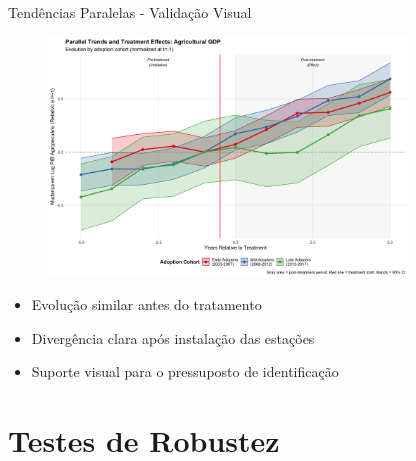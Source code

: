 \documentclass[10pt,aspectratio=169]{beamer}
\begin{document}
\begin{frame}{Tendências Paralelas - Validação Visual}
\begin{figure}
\centering
\includegraphics[width=0.85\textwidth]{../../../data/outputs/parallel_trends_complete_pib_agro_normalized.png}
\end{figure}

\begin{itemize}
    \item Evolução similar antes do tratamento
    \item Divergência clara após instalação das estações
    \item Suporte visual para o pressuposto de identificação
\end{itemize}
\end{frame}

\section{Testes de Robustez}
\end{document}
